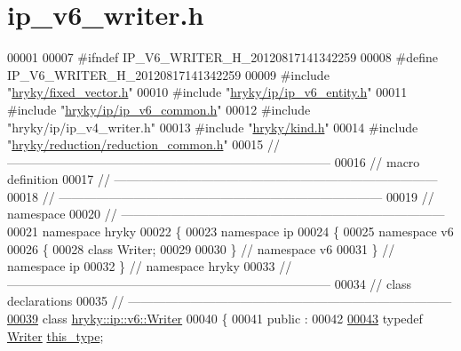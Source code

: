 \hypertarget{ip__v6__writer_8h_source}{\section{ip\-\_\-v6\-\_\-writer.\-h}
}

\begin{DoxyCode}
00001 
00007 \textcolor{preprocessor}{#ifndef IP\_V6\_WRITER\_H\_20120817141342259}
00008 \textcolor{preprocessor}{}\textcolor{preprocessor}{#define IP\_V6\_WRITER\_H\_20120817141342259}
00009 \textcolor{preprocessor}{}\textcolor{preprocessor}{#include "\hyperlink{fixed__vector_8h}{hryky/fixed_vector.h}"}
00010 \textcolor{preprocessor}{#include "\hyperlink{ip__v6__entity_8h}{hryky/ip/ip_v6_entity.h}"}
00011 \textcolor{preprocessor}{#include "\hyperlink{ip__v6__common_8h}{hryky/ip/ip_v6_common.h}"}
00012 \textcolor{preprocessor}{#include "hryky/ip/ip\_v4\_writer.h"}
00013 \textcolor{preprocessor}{#include "\hyperlink{kind_8h}{hryky/kind.h}"}
00014 \textcolor{preprocessor}{#include "\hyperlink{reduction__common_8h}{hryky/reduction/reduction_common.h}"}
00015 \textcolor{comment}{//
      ------------------------------------------------------------------------------}
00016 \textcolor{comment}{// macro definition}
00017 \textcolor{comment}{//
      ------------------------------------------------------------------------------}
00018 \textcolor{comment}{//
      ------------------------------------------------------------------------------}
00019 \textcolor{comment}{// namespace}
00020 \textcolor{comment}{//
      ------------------------------------------------------------------------------}
00021 \textcolor{keyword}{namespace }hryky
00022 \{
00023 \textcolor{keyword}{namespace }ip
00024 \{
00025 \textcolor{keyword}{namespace }v6
00026 \{
00028     \textcolor{keyword}{class }Writer;
00029 
00030 \} \textcolor{comment}{// namespace v6}
00031 \} \textcolor{comment}{// namespace ip}
00032 \} \textcolor{comment}{// namespace hryky}
00033 \textcolor{comment}{//
      ------------------------------------------------------------------------------}
00034 \textcolor{comment}{// class declarations}
00035 \textcolor{comment}{//
      ------------------------------------------------------------------------------}
\hypertarget{ip__v6__writer_8h_source_l00039}{}\hyperlink{classhryky_1_1ip_1_1v6_1_1_writer}{00039} \textcolor{comment}{}\textcolor{keyword}{class }\hyperlink{classhryky_1_1ip_1_1v6_1_1_writer}{hryky::ip::v6::Writer}
00040 \{
00041 \textcolor{keyword}{public} :
00042 
\hypertarget{ip__v6__writer_8h_source_l00043}{}\hyperlink{classhryky_1_1ip_1_1v6_1_1_writer_ab87fa5857b896ccb6e80da83edd48c32}{00043}     \textcolor{keyword}{typedef} \hyperlink{classhryky_1_1ip_1_1v6_1_1_writer}{Writer} \hyperlink{classhryky_1_1ip_1_1v6_1_1_writer_ab87fa5857b896ccb6e80da83edd48c32}{this_type};

\end{DoxyCode}

